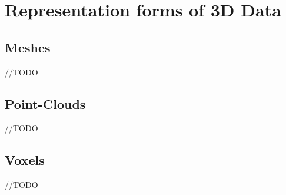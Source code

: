 \section{Representation forms of 3D Data}
\label{3Drepresentation}

\subsection{Meshes}
//TODO

\subsection{Point-Clouds}
//TODO

\subsection{Voxels}
//TODO


